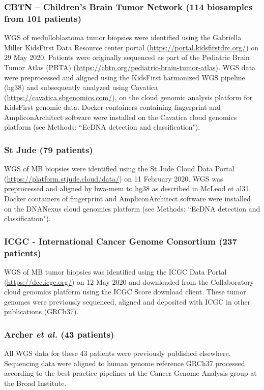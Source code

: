 \subsubsection{CBTN -- Children's Brain Tumor Network (114 biosamples from 101 patients)} WGS of medulloblastoma tumor biopsies were identified using the Gabriella Miller KidsFirst Data Resource center portal (\url{https://portal.kidsfirstdrc.org/}) on 29 May 2020. Patients were originally sequenced as part of the Pediatric Brain Tumor Atlas (PBTA) (\url{https://cbtn.org/pediatric-brain-tumor-atlas}). WGS data were preprocessed and aligned using the KidsFirst harmonized WGS pipeline (hg38) and subsequently analyzed using Cavatica (\url{https://cavatica.sbgenomics.com/}), on the cloud genomic analysis platform for KidsFirst genomic data. Docker containers containing fingerprint and AmpliconArchitect software were installed on the Cavatica cloud genomics platform (see Methods: ``EcDNA detection and classification").

\subsubsection{St Jude (79 patients)} WGS of MB biopsies were identified using the St Jude Cloud Data Portal (\url{https://platform.stjude.cloud/data/}) on 11 February 2020. WGS was preprocessed and aligned by bwa-mem to hg38 as described in McLeod et al31. Docker containers of fingerprint and AmpliconArchitect software were installed on the DNANexus cloud genomics platform (see Methods: ``EcDNA detection and classification").
\subsubsection{ICGC - International Cancer Genome Consortium (237 patients)} WGS of MB tumor biopsies was identified using the ICGC Data Portal (\url{https://dcc.icgc.org/}) on 12 May 2020 and downloaded from the Collaboratory cloud genomics platform using the ICGC Score download client. These tumor genomes were previously sequenced, aligned and deposited with ICGC in other publications (GRCh37)\cite{Northcott_2017,pcawg}.

\subsubsection{Archer \textit{et al.} (43 patients)} All WGS data for these 43 patients were previously published elsewhere\cite{Northcott_2017}. Sequencing data were aligned to human genome reference GRCh37 processed according to the best practice pipelines at the Cancer Genome Analysis group at the Broad Institute\cite{archer_2017}.

